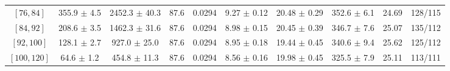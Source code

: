 \begin{tabular}{c||c|c|c|c|c|c|c||c|c}
$[76, 84]$ & 355.9 $\pm$ 4.5 & 2452.3 $\pm$ 40.3 & 87.6 & 0.0294 & 9.27 $\pm$ 0.12 & 20.48 $\pm$ 0.29 & 352.6 $\pm$ 6.1 & 24.69 & 128/115\\
$[84, 92]$ & 208.6 $\pm$ 3.5 & 1462.3 $\pm$ 31.6 & 87.6 & 0.0294 & 8.98 $\pm$ 0.15 & 20.45 $\pm$ 0.39 & 346.7 $\pm$ 7.6 & 25.07 & 135/112\\
$[92, 100]$ & 128.1 $\pm$ 2.7 & 927.0 $\pm$ 25.0 & 87.6 & 0.0294 & 8.95 $\pm$ 0.18 & 19.44 $\pm$ 0.45 & 340.6 $\pm$ 9.4 & 25.62 & 125/112\\
$[100, 120]$ & 64.6 $\pm$ 1.2 & 454.8 $\pm$ 11.3 & 87.6 & 0.0294 & 8.56 $\pm$ 0.16 & 19.98 $\pm$ 0.45 & 325.5 $\pm$ 7.9 & 25.11 & 113/111\\
\end{tabular}
